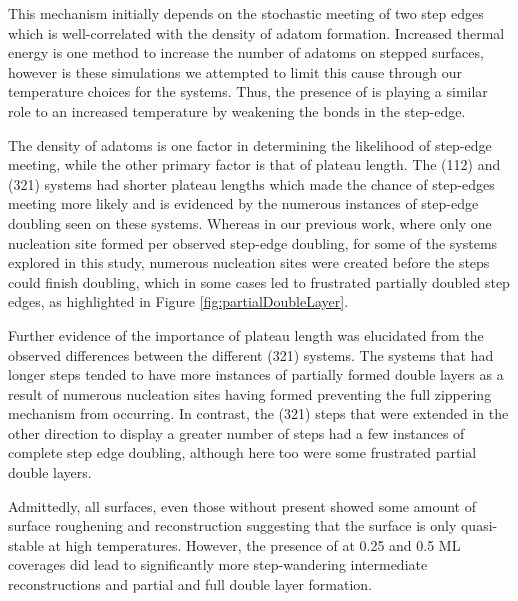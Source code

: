 This mechanism initially depends on the stochastic meeting of two step edges
which is well-correlated with the density of adatom formation. Increased
thermal energy is one method to increase the number of adatoms on stepped
surfaces, however is these simulations we attempted to limit this cause through
our temperature choices for the systems. Thus, the presence of  is
playing a similar role to an increased temperature by weakening the
 bonds in the step-edge.

The density of adatoms is one factor in determining the likelihood of step-edge
meeting, while the other primary factor is that of plateau length. The (112)
and (321) systems had shorter plateau lengths which made the chance of
step-edges meeting more likely and is evidenced by the numerous instances of
step-edge doubling seen on these systems. Whereas in our previous work, where
only one nucleation site formed per observed step-edge doubling, for some of
the systems explored in this study, numerous nucleation sites were created
before the steps could finish doubling, which in some cases led to
frustrated partially doubled step edges, as highlighted in Figure
\ref{fig:partialDoubleLayer}.

Further evidence of the importance of plateau length was elucidated from the
observed differences between the different (321) systems. The systems that had
longer steps tended to have more instances of partially formed double layers as
a result of numerous nucleation sites having formed preventing the full
zippering mechanism from occurring. In contrast, the (321) steps that were
extended in the other direction to display a greater number of steps had a few
instances of complete step edge doubling, although here too were some
frustrated partial double layers.

Admittedly, all surfaces, even those without  present showed some amount
of surface roughening and reconstruction suggesting that the surface is only
quasi-stable at high temperatures. However, the presence of  at 0.25 and
0.5 ML coverages did lead to significantly more step-wandering intermediate
reconstructions and partial and full double layer formation.



